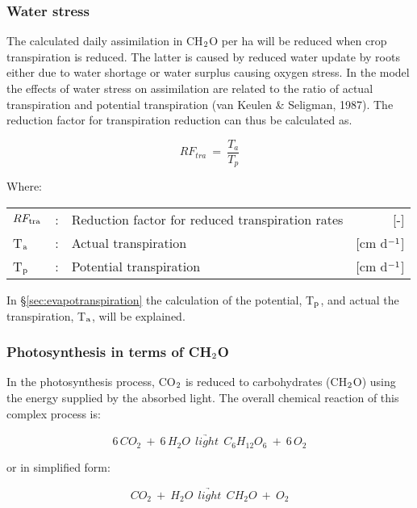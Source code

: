 \subsubsection{Water stress}
\label{sec:AssimilationWaterStress}
The calculated daily assimilation in CH$_{{\rm 2}}$O per ha will be reduced when crop transpiration
is reduced. The latter is caused by reduced water update by roots either due to water shortage or water 
surplus causing oxygen stress. In the model the effects of water stress on assimilation are related 
to the ratio of actual transpiration and potential transpiration (van Keulen \& Seligman, 1987).
The reduction factor for transpiration reduction can thus be calculated as.

\begin{equation}
\label{eq:5.37}
RF_{tra} ~=~ {\frac{T _{a} }{T _{p} }}
\end{equation}

Where:\\[5pt]
\begin{tabularx}{\textwidth}{llXr}
	$RF_{{\rm tra}}$ &:& Reduction factor for reduced transpiration rates   & [-]\\
	T$_{{\rm a}}$ &:& Actual transpiration   &     [cm d$^{{\rm -1}}$]\\
	T$_{{\rm p}}$ &:& Potential transpiration   &     [cm d$^{{\rm -1}}$]\\
\end{tabularx}

In \S \ref{sec:evapotranspiration} the calculation of the potential, T$_{{\rm p}}$, and actual 
the transpiration, T$_{{\rm a}}$, will be explained.


\subsubsection{Photosynthesis in terms of CH$_{{\rm 2}}$O}
In the photosynthesis process, CO$_{{\rm 2}}$ is reduced to carbohydrates (CH$_{{\rm 2}}$O) using the energy
supplied by the absorbed light. The overall chemical reaction of this complex process is:

\begin{equation}
6\, CO_{2} ~+~ 6\, H_{2}O ~~ \underrightarrow{light} ~~ C_{6} H_{12} O_{6} ~+~ 6\, O_{2}
\end{equation}

or in simplified form:

\begin{equation}
CO_{2} ~+~ H_{2} O~~ \underrightarrow{light} ~~ CH_{2} O ~+~ O_{2}
\end{equation}


